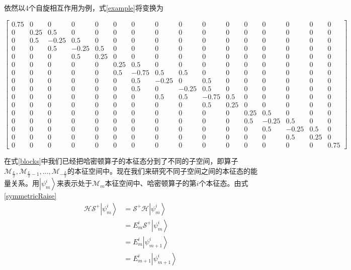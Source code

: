 \documentclass[UTF8,12pt]{article}
\providecommand\Ket[1]{\left|\right. #1 \left.\right\rangle}
\numberwithin{equation}{subsection}
\begin{document}
	依然以4个自旋相互作用为例，式\ref{example}将变换为
	\begin{snugshade}
		\begin{tiny}
			\begin{equation}
				\left[\begin{array}{r|rrrr|rrrrrr|rrrr|r}
					0.75&0&0&0&0&0&0&0&0&0&0&0&0&0&0&0\\
					\hline
					0&0.25&0.5&0&0&0&0&0&0&0&0&0&0&0&0&0\\
					0&0.5&-0.25&0.5&0&0&0&0&0&0&0&0&0&0&0&0\\
					0&0&0.5&-0.25&0.5&0&0&0&0&0&0&0&0&0&0&0\\
					0&0&0&0.5&0.25&0&0&0&0&0&0&0&0&0&0&0\\
					\hline
					0&0&0&0&0&0.25&0.5&0&0&0&0&0&0&0&0&0\\
					0&0&0&0&0&0.5&-0.75&0.5&0.5&0&0&0&0&0&0&0\\
					0&0&0&0&0&0&0.5&-0.25&0&0.5&0&0&0&0&0&0\\
					0&0&0&0&0&0&0.5&0&-0.25&0.5&0&0&0&0&0&0\\
					0&0&0&0&0&0&0&0.5&0.5&-0.75&0.5&0&0&0&0&0\\
					0&0&0&0&0&0&0&0&0&0.5&0.25&0&0&0&0&0\\
					\hline
					0&0&0&0&0&0&0&0&0&0&0&0.25&0.5&0&0&0\\
					0&0&0&0&0&0&0&0&0&0&0&0.5&-0.25&0.5&0&0\\
					0&0&0&0&0&0&0&0&0&0&0&0&0.5&-0.25&0.5&0\\
					0&0&0&0&0&0&0&0&0&0&0&0&0&0.5&0.25&0\\
					\hline
					0&0&0&0&0&0&0&0&0&0&0&0&0&0&0&0.75
				\end{array}\right]
				\label{exampleChange}
			\end{equation}
		\end{tiny}
	\end{snugshade}
	
	在式\ref{blocks}中我们已经把哈密顿算子的本征态分到了不同的子空间，即算子\\$\mathcal M_{\frac{L}{2}},\mathcal M_{\frac{L}{2}-1},\dots,\mathcal M_{-\frac{L}{2}}$的本征空间中。现在我们来研究不同子空间之间的本征态的能量关系。用$\Ket{\psi^i_m}$来表示处于$\mathcal M_m$本征空间中、哈密顿算子的第$i$个本征态。由式\ref{symmetricRaise}
	\begin{align*}
		\mathcal {HS}^+\Ket{\psi^i_m} &= \mathcal S^+\mathcal H\Ket{\psi^i_m}\\
						   &= E^i_m\mathcal S^+\Ket{\psi^i_m}\\
						   &= E^i_m\Ket{\psi^i_{m+1}}\\
						   &= E^i_{m+1}\Ket{\psi^i_{m+1}}
	\end{align*}
	
\end{document}
